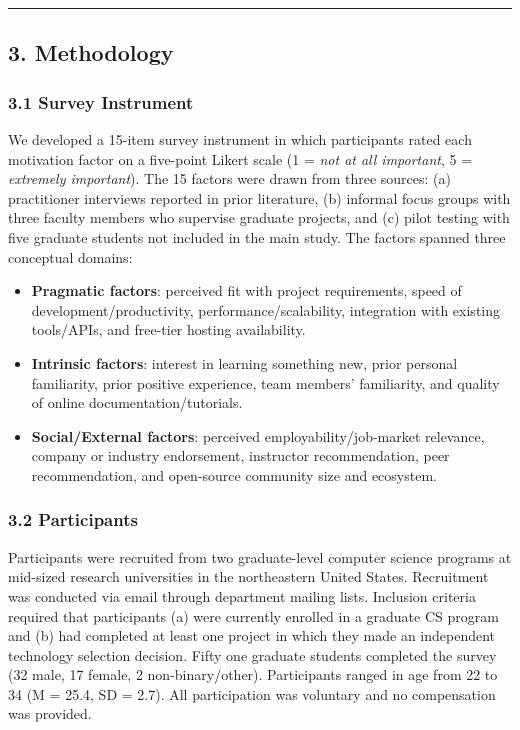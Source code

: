 \documentclass[
]{article}
\providecommand{\tightlist}{%
  \setlength{\itemsep}{0pt}\setlength{\parskip}{0pt}}
\begin{document}
\begin{center}\rule{0.5\linewidth}{0.5pt}\end{center}

\subsection{3. Methodology}\label{methodology}

\subsubsection{3.1 Survey Instrument}\label{survey-instrument}

We developed a 15-item survey instrument in which participants rated
each motivation factor on a five-point Likert scale (1 = \emph{not at
all important}, 5 = \emph{extremely important}). The 15 factors were
drawn from three sources: (a) practitioner interviews reported in prior
literature, (b) informal focus groups with three faculty members who
supervise graduate projects, and (c) pilot testing with five graduate
students not included in the main study. The factors spanned three
conceptual domains:

\begin{itemize}
\tightlist
\item
  \textbf{Pragmatic factors}: perceived fit with project requirements,
  speed of development/productivity, performance/scalability,
  integration with existing tools/APIs, and free-tier hosting
  availability.
\item
  \textbf{Intrinsic factors}: interest in learning something new, prior
  personal familiarity, prior positive experience, team members'
  familiarity, and quality of online documentation/tutorials.
\item
  \textbf{Social/External factors}: perceived employability/job-market
  relevance, company or industry endorsement, instructor recommendation,
  peer recommendation, and open-source community size and ecosystem.
\end{itemize}

\subsubsection{3.2 Participants}\label{participants}

Participants were recruited from two graduate-level computer science
programs at mid-sized research universities in the northeastern United
States. Recruitment was conducted via email through department mailing
lists. Inclusion criteria required that participants (a) were currently
enrolled in a graduate CS program and (b) had completed at least one
project in which they made an independent technology selection decision.
Fifty one graduate students completed the survey (32 male, 17 female, 2
non-binary/other). Participants ranged in age from 22 to 34 (M = 25.4,
SD = 2.7). All participation was voluntary and no compensation was
provided.
\end{document}
